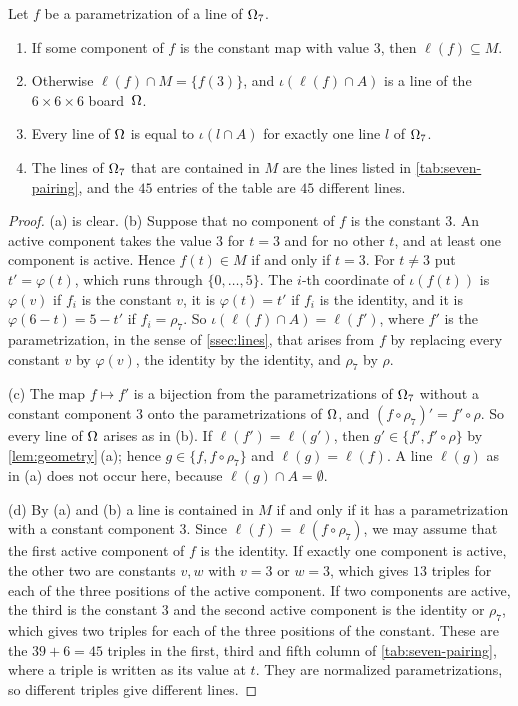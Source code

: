 \begin{lemma}\label{lem:seven-decomp}
Let $f$ be a parametrization of a line of $\Omega_7$.
\begin{enumerate}[label=\textup{(\alph*)}]
\item If some component of $f$ is the constant map with value $3$, then $\ell(f)\subseteq M$.
\item Otherwise $\ell(f)\cap M=\{f(3)\}$, and $\iota(\ell(f)\cap A)$ is a line of the $6\times6\times6$
      board~$\Omega$.
\item Every line of $\Omega$ is equal to $\iota(l\cap A)$ for exactly one line $l$ of $\Omega_7$.
\item The lines of $\Omega_7$ that are contained in $M$ are the lines listed in
      \cref{tab:seven-pairing}, and the $45$ entries of the table are $45$ different lines.
\end{enumerate}
\end{lemma}

\begin{proof}
(a) is clear. (b) Suppose that no component of $f$ is the constant $3$. An active component takes the
value $3$ for $t=3$ and for no other $t$, and at least one component is active. Hence $f(t)\in M$ if and
only if $t=3$. For $t\ne 3$ put $t'=\varphi(t)$, which runs through $\{0,\dots,5\}$. The $i$-th
coordinate of $\iota(f(t))$ is $\varphi(v)$ if $f_i$ is the constant $v$, it is $\varphi(t)=t'$ if $f_i$ is
the identity, and it is $\varphi(6-t)=5-t'$ if $f_i=\rho_7$. So $\iota(\ell(f)\cap A)=\ell(f')$, where $f'$
is the parametrization, in the sense of \cref{ssec:lines}, that arises from $f$ by replacing every
constant $v$ by $\varphi(v)$, the identity by the identity, and $\rho_7$ by $\rho$.

(c) The map $f\mapsto f'$ is a bijection from the parametrizations of $\Omega_7$ without a constant
component $3$ onto the parametrizations of $\Omega$, and $(f\circ\rho_7)'=f'\circ\rho$. So every line of
$\Omega$ arises as in (b). If $\ell(f')=\ell(g')$, then $g'\in\{f',f'\circ\rho\}$ by
\cref{lem:geometry}\,(a); hence $g\in\{f,f\circ\rho_7\}$ and $\ell(g)=\ell(f)$. A line $\ell(g)$ as in
(a) does not occur here, because $\ell(g)\cap A=\emptyset$.

(d) By (a) and (b) a line is contained in $M$ if and only if it has a parametrization with a constant
component $3$. Since $\ell(f)=\ell(f\circ\rho_7)$, we may assume that the first active component of $f$
is the identity. If exactly one component is active, the other two are constants $v,w$ with $v=3$ or
$w=3$, which gives $13$ triples for each of the three positions of the active component. If two
components are active, the third is the constant $3$ and the second active component is the identity
or $\rho_7$, which gives two triples for each of the three positions of the constant. These are the
$39+6=45$ triples in the first, third and fifth column of \cref{tab:seven-pairing}, where a triple is
written as its value at $t$. They are normalized parametrizations, so different triples give different
lines.
\end{proof}

